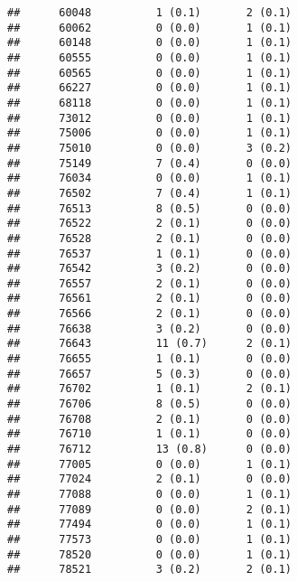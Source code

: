 \documentclass[]{article}
\begin{document}
\begin{verbatim}
##      60048          1 (0.1)       2 (0.1)                        
##      60062          0 (0.0)       1 (0.1)                        
##      60148          0 (0.0)       1 (0.1)                        
##      60555          0 (0.0)       1 (0.1)                        
##      60565          0 (0.0)       1 (0.1)                        
##      66227          0 (0.0)       1 (0.1)                        
##      68118          0 (0.0)       1 (0.1)                        
##      73012          0 (0.0)       1 (0.1)                        
##      75006          0 (0.0)       1 (0.1)                        
##      75010          0 (0.0)       3 (0.2)                        
##      75149          7 (0.4)       0 (0.0)                        
##      76034          0 (0.0)       1 (0.1)                        
##      76502          7 (0.4)       1 (0.1)                        
##      76513          8 (0.5)       0 (0.0)                        
##      76522          2 (0.1)       0 (0.0)                        
##      76528          2 (0.1)       0 (0.0)                        
##      76537          1 (0.1)       0 (0.0)                        
##      76542          3 (0.2)       0 (0.0)                        
##      76557          2 (0.1)       0 (0.0)                        
##      76561          2 (0.1)       0 (0.0)                        
##      76566          2 (0.1)       0 (0.0)                        
##      76638          3 (0.2)       0 (0.0)                        
##      76643          11 (0.7)      2 (0.1)                        
##      76655          1 (0.1)       0 (0.0)                        
##      76657          5 (0.3)       0 (0.0)                        
##      76702          1 (0.1)       2 (0.1)                        
##      76706          8 (0.5)       0 (0.0)                        
##      76708          2 (0.1)       0 (0.0)                        
##      76710          1 (0.1)       0 (0.0)                        
##      76712          13 (0.8)      0 (0.0)                        
##      77005          0 (0.0)       1 (0.1)                        
##      77024          2 (0.1)       0 (0.0)                        
##      77088          0 (0.0)       1 (0.1)                        
##      77089          0 (0.0)       2 (0.1)                        
##      77494          0 (0.0)       1 (0.1)                        
##      77573          0 (0.0)       1 (0.1)                        
##      78520          0 (0.0)       1 (0.1)                        
##      78521          3 (0.2)       2 (0.1)                        

\end{verbatim}
\end{document}
